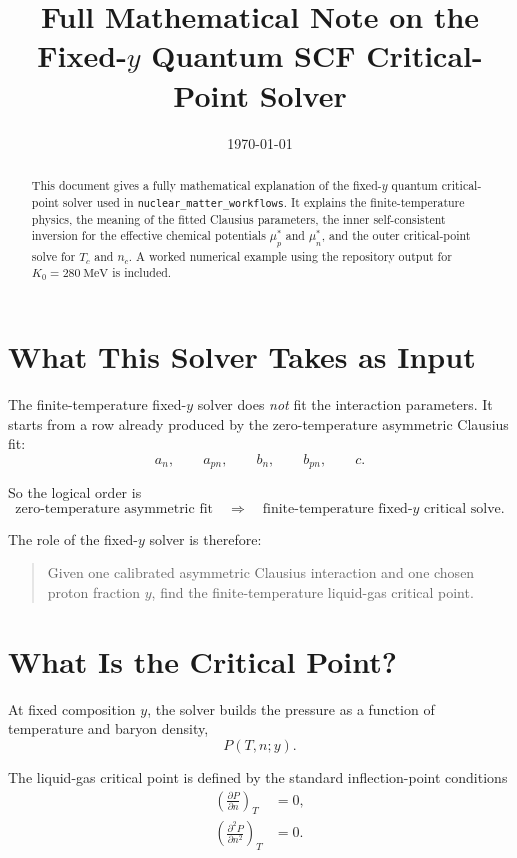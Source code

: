 \documentclass[11pt]{article}
\title{Full Mathematical Note on the Fixed-\texorpdfstring{$y$}{y} Quantum SCF Critical-Point Solver}
\author{}
\date{\today}
\begin{document}
\maketitle

\begin{abstract}
This document gives a fully mathematical explanation of the fixed-$y$ quantum
critical-point solver used in \texttt{nuclear\_matter\_workflows}. It explains
the finite-temperature physics, the meaning of the fitted Clausius parameters,
the inner self-consistent inversion for the effective chemical potentials
$\mu_p^\ast$ and $\mu_n^\ast$, and the outer critical-point solve for
$T_c$ and $n_c$. A worked numerical example using the repository output for
$K_0=280\ \mathrm{MeV}$ is included.
\end{abstract}

\tableofcontents

\section{What This Solver Takes as Input}

The finite-temperature fixed-$y$ solver does \emph{not} fit the interaction
parameters. It starts from a row already produced by the zero-temperature
asymmetric Clausius fit:
\[
a_n,\qquad a_{pn},\qquad b_n,\qquad b_{pn},\qquad c.
\]

So the logical order is
\[
\text{zero-temperature asymmetric fit}
\quad \Longrightarrow \quad
\text{finite-temperature fixed-}y\text{ critical solve}.
\]

The role of the fixed-$y$ solver is therefore:
\begin{quote}
Given one calibrated asymmetric Clausius interaction and one chosen proton
fraction $y$, find the finite-temperature liquid-gas critical point.
\end{quote}

\section{What Is the Critical Point?}

At fixed composition $y$, the solver builds the pressure as a function of
temperature and baryon density,
\[
P(T,n;y).
\]

The liquid-gas critical point is defined by the standard inflection-point
conditions
\begin{align}
\left(\frac{\partial P}{\partial n}\right)_T &= 0, \\
\left(\frac{\partial^2 P}{\partial n^2}\right)_T &= 0.
\end{align}
\end{document}
